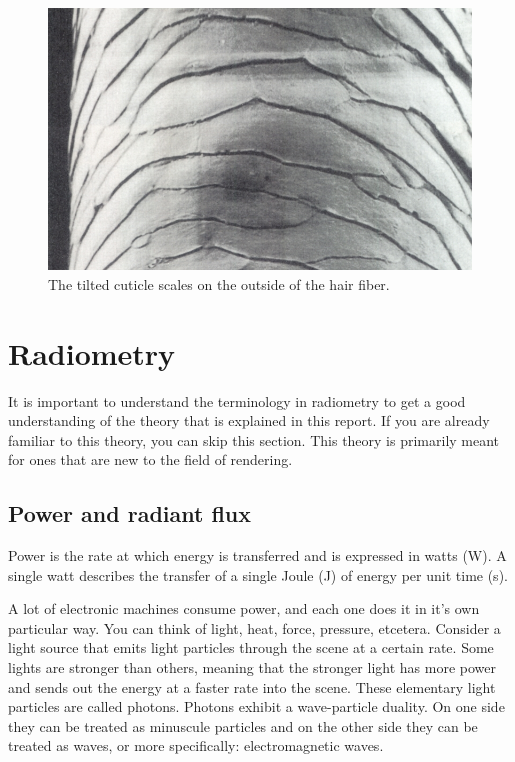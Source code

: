 \documentclass[11pt,a4paper]{report}
\begin{document}
\begin{figure}[h]
\begin{center}
\includegraphics[scale=0.4]{images/hair_structure.jpeg}
\caption{The tilted cuticle scales on the outside of the hair fiber.}
\label{fig_hair_structure}
\end{center}
\end{figure}

\section{Radiometry}
It is important to understand the terminology in radiometry to get a good understanding of the theory that is explained in this report. If you are already familiar to this theory, you can skip this section. This theory is primarily meant for ones that are new to the field of rendering. 

\subsection{Power and radiant flux}

Power is the rate at which energy is transferred and is expressed in watts (W). A single watt describes the transfer of a single Joule (J) of energy per unit time (s).

A lot of electronic machines consume power, and each one does it in it's own particular way. You can think of light, heat, force, pressure, etcetera. Consider a light source that emits light particles through the scene at a certain rate. Some lights are stronger than others, meaning that the stronger light has more power and sends out the energy at a faster rate into the scene. These elementary light particles are called photons. Photons exhibit a wave-particle duality. On one side they can be treated as minuscule particles and on the other side they can be treated as waves, or more specifically: electromagnetic waves.
\end{document}
